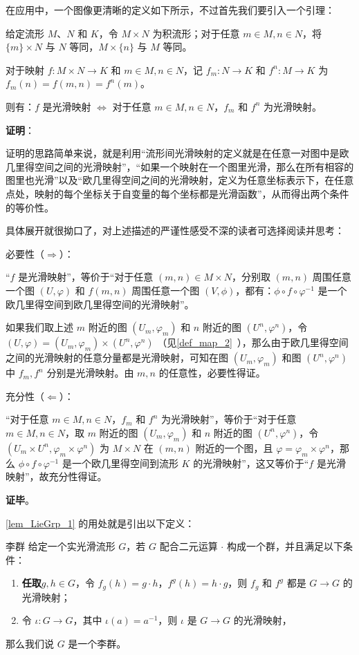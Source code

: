 在应用中，一个图像更清晰的定义如下所示，不过首先我们要引入一个引理：

\begin{lemma}{}\label{lem_LieGrp_1}
给定流形 $M$、$N$ 和 $K$，令 $M\times N$ 为积流形；对于任意 $m\in M, n\in N$，将 $\{m\}\times N$ 与 $N$ 等同，$M\times \{n\}$ 与 $M$ 等同。

对于映射 $f:M\times N\to K$ 和 $m\in M, n\in N$，记 $f_m:N\to K$ 和 $f^n:M\to K$ 为 $f_m(n)=f(m, n)=f^n(m)$。

则有：$f$ 是光滑映射 $\iff$ 对于任意 $m\in M, n\in N$，$f_m$ 和 $f^n$ 为光滑映射。
\end{lemma}

\textbf{证明}：

证明的思路简单来说，就是利用“流形间光滑映射的定义就是在任意一对图中是欧几里得空间之间的光滑映射”，“如果一个映射在一个图里光滑，那么在所有相容的图里也光滑”以及“欧几里得空间之间的光滑映射，定义为任意坐标表示下，在任意点处，映射的每个坐标关于自变量的每个坐标都是光滑函数”，从而得出两个条件的等价性。

具体展开就很拗口了，对上述描述的严谨性感受不深的读者可选择阅读并思考：

必要性（$\Rightarrow$）：

“$f$ 是光滑映射”，等价于“对于任意 $(m, n)\in M\times N$，分别取 $(m, n)$ 周围任意一个图 $(U, \varphi)$ 和 $f(m, n)$ 周围任意一个图 $(V, \phi)$，都有：$\phi\circ f\circ\varphi^{-1}$ 是一个欧几里得空间到欧几里得空间的光滑映射”。

如果我们取上述 $m$ 附近的图 $(U_m, \varphi_m)$ 和 $n$ 附近的图 $(U^n, \varphi^n)$，令 $(U, \varphi)=(U_m, \varphi_m)\times(U^n, \varphi^n)$ （见\autoref{def_map_2}~），那么由于欧几里得空间之间的光滑映射的任意分量都是光滑映射，可知在图 $(U_m, \varphi_m)$ 和图 $(U^n, \varphi^n)$ 中 $f_m, f^n$ 分别是光滑映射。由 $m, n$ 的任意性，必要性得证。

充分性（$\Leftarrow$）：

“对于任意 $m\in M, n\in N$，$f_m$ 和 $f^n$ 为光滑映射”，等价于“对于任意 $m\in M, n\in N$，取 $m$ 附近的图 $(U_m, \varphi_m)$ 和 $n$ 附近的图 $(U^n, \varphi^n)$，令 $(U_m\times U^n, \varphi_m\times\varphi^n)$ 为 $M\times N$ 在 $(m, n)$ 附近的一个图，且 $\varphi=\varphi_m\times\varphi^n$，那么 $\phi\circ f\circ\varphi^{-1}$ 是一个欧几里得空间到流形 $K$ 的光滑映射”，这又等价于“$f$ 是光滑映射”，故充分性得证。

\textbf{证毕}。

\autoref{lem_LieGrp_1} 的用处就是引出以下定义：

\begin{definition}{李群}\label{def_LieGrp_4}
给定一个实光滑流形 $G$，若 $G$ 配合二元运算 $\cdot$ 构成一个群，并且满足以下条件：
\begin{enumerate}
\item \textbf{任取}$g, h\in G$，令 $f_g(h)=g\cdot h$，$f^g(h)=h\cdot g$，则 $f_g$ 和 $f^g$ 都是 $G\to G$ 的光滑映射；
\item 令 $\iota:G\to G$，其中 $\iota(a)=a^{-1}$，则 $\iota$ 是 $G\to G$ 的光滑映射，
\end{enumerate}
那么我们说 $G$ 是一个李群。
\end{definition}

